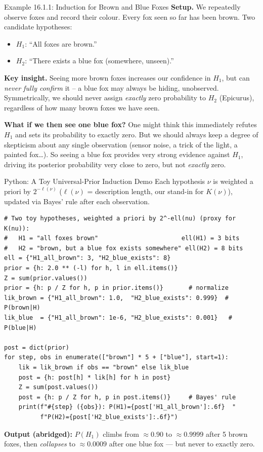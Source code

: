 \documentclass[aspectratio=169,10pt]{beamer}
\begin{document}
\begin{frame}{Example 16.1.1: Induction for Brown and Blue Foxes}
  \textbf{Setup.} We repeatedly observe foxes and record their colour. Every
  fox seen so far has been brown. Two candidate hypotheses:
  \begin{itemize}
    \item $H_1$: ``All foxes are brown.''
    \item $H_2$: ``There exists a blue fox (somewhere, unseen).''
  \end{itemize}

  \textbf{Key insight.} Seeing more brown foxes increases our confidence in
  $H_1$, but can \emph{never fully confirm} it -- a blue fox may always be
  hiding, unobserved. Symmetrically, we should never assign \emph{exactly}
  zero probability to $H_2$ (Epicurus), regardless of how many brown foxes
  we have seen.

  \vspace{0.3em}
  \textbf{What if we then see one blue fox?} One might think this
  immediately refutes $H_1$ and sets its probability to exactly zero. But
  we should always keep a degree of skepticism about any single
  observation (sensor noise, a trick of the light, a painted fox\ldots).
  So seeing a blue fox provides very strong evidence against $H_1$, driving
  its posterior probability very close to zero, but not \emph{exactly}
  zero.
\end{frame}

\begin{frame}[fragile]{Python: A Toy Universal-Prior Induction Demo}
  Each hypothesis $\nu$ is weighted a priori by $2^{-\ell(\nu)}$
  ($\ell(\nu)$ = description length, our stand-in for $K(\nu)$), updated
  via Bayes' rule after each observation.
  \begin{lstlisting}[style=pycode]
# Two toy hypotheses, weighted a priori by 2^-ell(nu) (proxy for K(nu)):
#   H1 = "all foxes brown"                       ell(H1) = 3 bits
#   H2 = "brown, but a blue fox exists somewhere" ell(H2) = 8 bits
ell = {"H1_all_brown": 3, "H2_blue_exists": 8}
prior = {h: 2.0 ** (-l) for h, l in ell.items()}
Z = sum(prior.values())
prior = {h: p / Z for h, p in prior.items()}       # normalize
lik_brown = {"H1_all_brown": 1.0,  "H2_blue_exists": 0.999}  # P(brown|H)
lik_blue  = {"H1_all_brown": 1e-6, "H2_blue_exists": 0.001}   # P(blue|H)

post = dict(prior)
for step, obs in enumerate(["brown"] * 5 + ["blue"], start=1):
    lik = lik_brown if obs == "brown" else lik_blue
    post = {h: post[h] * lik[h] for h in post}
    Z = sum(post.values())
    post = {h: p / Z for h, p in post.items()}     # Bayes' rule
    print(f"#{step} ({obs}): P(H1)={post['H1_all_brown']:.6f}  "
          f"P(H2)={post['H2_blue_exists']:.6f}")
  \end{lstlisting}
  \textbf{Output (abridged):} $P(H_1)$ climbs from $\approx0.90$ to
  $\approx0.9999$ after 5 brown foxes, then \emph{collapses} to
  $\approx0.0009$ after one blue fox --- but never to exactly zero.
\end{frame}
\end{document}
